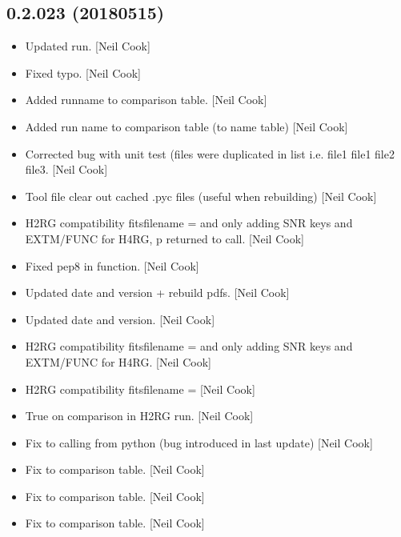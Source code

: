 \documentclass[a4paper,10pt,english]{report}
\begin{document}
\subsection{0.2.023 (2018\sphinxhyphen{}05\sphinxhyphen{}15)}
\label{\detokenize{misc/changelog:id456}}\begin{itemize}
\item {} 
Updated run. {[}Neil Cook{]}

\item {} 
Fixed typo. {[}Neil Cook{]}

\item {} 
Added runname to comparison table. {[}Neil Cook{]}

\item {} 
Added run name to comparison table (to name table) {[}Neil Cook{]}

\item {} 
Corrected bug with unit test (files were duplicated in list i.e. file1
file1 file2 file3. {[}Neil Cook{]}

\item {} 
Tool file \sphinxhyphen{} clear out cached .pyc files (useful when rebuilding) {[}Neil
Cook{]}

\item {} 
H2RG compatibility \sphinxhyphen{} fitsfilename =  and only adding
SNR keys and EXTM/FUNC for H4RG, p returned to call. {[}Neil Cook{]}

\item {} 
Fixed pep8 in  function. {[}Neil Cook{]}

\item {} 
Updated date and version + rebuild pdfs. {[}Neil Cook{]}

\item {} 
Updated date and version. {[}Neil Cook{]}

\item {} 
H2RG compatibility \sphinxhyphen{} fitsfilename =  and only adding
SNR keys and EXTM/FUNC for H4RG. {[}Neil Cook{]}

\item {} 
H2RG compatibility \sphinxhyphen{} fitsfilename =  {[}Neil Cook{]}

\item {} 
True on comparison in H2RG run. {[}Neil Cook{]}

\item {} 
Fix to calling from python (bug introduced in last update) {[}Neil Cook{]}

\item {} 
Fix to  comparison table. {[}Neil Cook{]}

\item {} 
Fix to  comparison table. {[}Neil Cook{]}

\item {} 
Fix to  comparison table. {[}Neil Cook{]}

\end{itemize}
\end{document}
